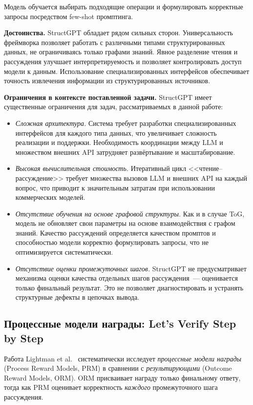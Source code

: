 Модель обучается выбирать подходящие операции и формулировать корректные запросы посредством few-shot промптинга.

\textbf{Достоинства.}
StructGPT обладает рядом сильных сторон. Универсальность фреймворка позволяет работать с различными типами структурированных данных, не ограничиваясь только графами знаний. Явное разделение чтения и рассуждения улучшает интерпретируемость и позволяет контролировать доступ модели к данным. Использование специализированных интерфейсов обеспечивает точность извлечения информации из структурированных источников.

\textbf{Ограничения в контексте поставленной задачи.}
StructGPT имеет существенные ограничения для задач, рассматриваемых в данной работе:
\begin{itemize}
    \item \textit{Сложная архитектура.} Система требует разработки специализированных интерфейсов для каждого типа данных, что увеличивает сложность реализации и поддержки. Необходимость координации между LLM и множеством внешних API затрудняет развёртывание и масштабирование.
    \item \textit{Высокая вычислительная стоимость.} Итеративный цикл <<чтение--рассуждение>> требует множества вызовов LLM и внешних API на каждый вопрос, что приводит к значительным затратам при использовании коммерческих моделей.
    \item \textit{Отсутствие обучения на основе графовой структуры.} Как и в случае ToG, модель не обновляет свои параметры на основе взаимодействия с графом знаний. Качество рассуждений определяется качеством промптов и способностью модели корректно формулировать запросы, что не оптимизируется систематически.
    \item \textit{Отсутствие оценки промежуточных шагов.} StructGPT не предусматривает механизма оценки качества отдельных шагов рассуждения~--- оценивается только финальный результат. Это не позволяет диагностировать и устранять структурные дефекты в цепочках вывода.
\end{itemize}

\subsection{Процессные модели награды: Let's Verify Step by Step}
\label{subsec:prm}

Работа Lightman et al.~\cite{lightman2023lets} систематически исследует \textit{процессные модели награды} (Process Reward Models, PRM) в сравнении с \textit{результирующими} (Outcome Reward Models, ORM). ORM присваивает награду только финальному ответу, тогда как PRM оценивает корректность \textit{каждого} промежуточного шага рассуждения.

